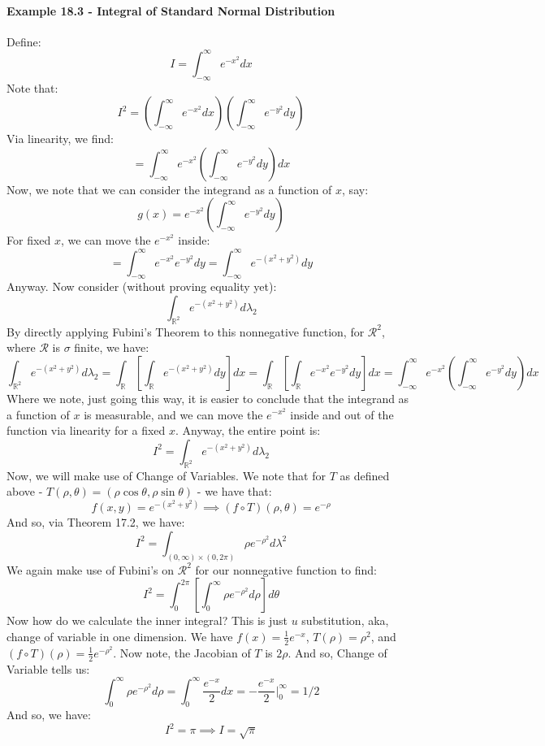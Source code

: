 \documentclass[12pt,a4paper]{article}
\newcommand{\1}[1]{\mathbbm{1}\left\{ #1 \right\}}
\newcommand{\R}{\mathbb{R}}
\newcommand{\rcal}{\mathcal{R}}
\begin{document}
\paragraph{Example 18.3 - Integral of Standard Normal Distribution} Define:
$$
	I = \int_{-\infty}^\infty e^{-x^2} dx
$$
Note that:
$$
	I^2 = \left(\int_{-\infty}^\infty e^{-x^2} dx\right)\left(\int_{-\infty}^\infty e^{-y^2} dy\right)
$$
Via linearity, we find:
$$
	= \int_{-\infty}^\infty e^{-x^2} \left(\int_{-\infty}^\infty e^{-y^2} dy\right) dx
$$
Now, we note that we can consider the integrand as a function of $x$, say:
$$
	g(x) = e^{-x^2} \left(\int_{-\infty}^\infty e^{-y^2} dy\right)
$$
For fixed $x$, we can move the $e^{-x^2}$ inside:
$$
	= \int_{-\infty}^\infty e^{-x^2}e^{-y^2} dy =
	\int_{-\infty}^\infty e^{-(x^2+y^2)} dy
$$
Anyway. Now consider (without proving equality yet):
$$
	\int_{\R^2} e^{-(x^2+y^2)} d\lambda_2
$$
By directly applying Fubini's Theorem to this nonnegative function, for $\rcal^2$, where $\rcal$ is $\sigma$ finite, we have:
$$
	\int_{\R^2} e^{-(x^2+y^2)} d\lambda_2 =
	\int_{\R} \left[\int_{\R} e^{-(x^2+y^2)} dy\right] dx =
	\int_{\R} \left[\int_{\R} e^{-x^2}e^{-y^2} dy\right]dx =
	\int_{-\infty}^\infty e^{-x^2} \left(\int_{-\infty}^\infty e^{-y^2} dy\right) dx
$$
Where we note, just going this way, it is easier to conclude that the integrand as a function of $x$ is measurable, and we can move the $e^{-x^2}$ inside and out of the function via linearity for a fixed $x$. Anyway, the entire point is:
$$
	I^2 = \int_{\R^2} e^{-(x^2+y^2)} d\lambda_2
$$
Now, we will make use of Change of Variables. We note that for $T$ as defined above - $T(\rho, \theta) = (\rho \cos \theta, \rho \sin \theta)$ - we have that:
$$
	f(x,y) = e^{-(x^2+y^2)} \implies (f \circ T)(\rho, \theta) = e^{-\rho}
$$
And so, via Theorem 17.2, we have:
$$
	I^2 = \int_{(0, \infty) \times (0, 2\pi)} \rho e^{-\rho^2} d\lambda^2
$$
We again make use of Fubini's on $\rcal^2$ for our nonnegative function to find:
$$
	I^2 = \int_0^{2\pi} \left[\int_0^{\infty} \rho e^{-\rho^2} d\rho\right] d\theta
$$
Now how do we calculate the inner integral? This is just $u$ substitution, aka, change of variable in one dimension. We have $f(x) = \frac{1}{2}e^{-x}$, $T(\rho) = \rho^2$, and $(f \circ T)(\rho) = \frac{1}{2}e^{-\rho^2}$. Now note, the Jacobian of $T$ is $2\rho$. And so, Change of Variable tells us:
$$
	\int_0^{\infty} \rho e^{-\rho^2} d\rho =
	\int_0^{\infty} \frac{e^{-x}}{2} dx = -\frac{e^{-x}}{2}\bigg|_0^{\infty} = 1/2
$$
And so, we have:
$$
	I^2 = \pi \implies I = \sqrt{\pi}
$$
\end{document}
